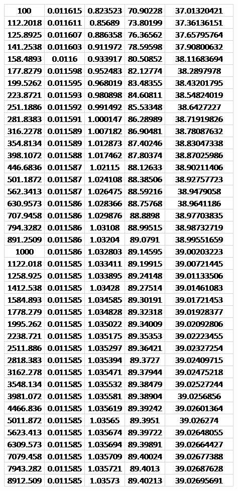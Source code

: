 \documentclass{article}
\begin{document}
	\pagebreak
	\begin{table}[!ht]
		\centering
		\includegraphics[width=0.4\textheight]{data_cascode_gain_2.png}
	\end{table}
	
\end{document}
